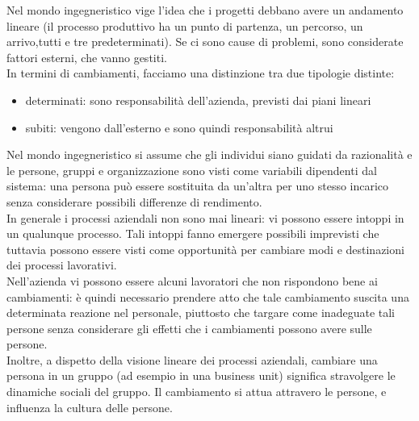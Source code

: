 Nel mondo ingegneristico vige l'idea che i progetti debbano avere un andamento lineare (il processo produttivo ha un punto di partenza, un percorso, un arrivo,tutti e tre predeterminati). Se ci sono cause di problemi, sono considerate fattori esterni, che vanno gestiti. \\
In termini di cambiamenti, facciamo una distinzione tra due tipologie distinte:
\begin{itemize}
  \item determinati: sono responsabilit\`a dell'azienda, previsti dai piani lineari
  \item subiti: vengono dall'esterno e sono quindi responsabilit\`a altrui
\end{itemize}
Nel mondo ingegneristico si assume che gli individui siano guidati da razionalit\`a e le persone, gruppi e organizzazione sono visti come variabili dipendenti dal sistema: una persona pu\`o essere sostituita da un'altra per uno stesso incarico senza considerare possibili differenze di rendimento. \\
In generale i processi aziendali non sono mai lineari: vi possono essere intoppi in un qualunque processo. Tali intoppi fanno emergere possibili imprevisti che tuttavia possono essere visti come opportunit\`a per cambiare modi e destinazioni dei processi lavorativi. \\
Nell'azienda vi possono essere alcuni lavoratori che non rispondono bene ai cambiamenti: \`e quindi necessario prendere atto che tale cambiamento suscita una determinata reazione nel personale, piuttosto che targare come inadeguate tali persone senza considerare gli effetti che i cambiamenti possono avere sulle persone. \\
Inoltre, a dispetto della visione lineare dei processi aziendali, cambiare una persona in un gruppo (ad esempio in una business unit) significa stravolgere le dinamiche sociali del gruppo. Il cambiamento si attua attravero le persone, e influenza la cultura delle persone.
